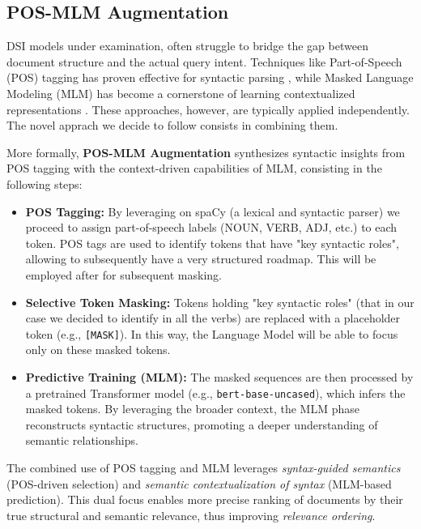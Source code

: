 \subsection{POS-MLM Augmentation}
DSI models under examination, often struggle to bridge the gap between document structure and the actual query intent. Techniques like Part-of-Speech (POS) tagging has proven effective for syntactic parsing \cite{toutanova2003feature}, while Masked Language Modeling (MLM) has become a cornerstone of learning contextualized representations \cite{devlin2018bert}. These approaches, however, are typically applied independently. The novel apprach we decide to follow consists in combining them.

More formally, \textbf{POS-MLM Augmentation} synthesizes syntactic insights from POS tagging with the context-driven capabilities of MLM, consisting in the following steps:

\begin{itemize}
    \item \textbf{POS Tagging:} By leveraging on spaCy (a lexical and syntactic parser) we proceed to assign part-of-speech labels (NOUN, VERB, ADJ, etc.) to each token.  POS tags are used to identify tokens that have  "key syntactic roles", allowing to subsequently have a very structured roadmap. This will be employed after for subsequent masking.
    \item \textbf{Selective Token Masking:} Tokens holding "key syntactic roles" (that in our case we decided to identify in all the verbs) are replaced with a placeholder token (e.g., \texttt{[MASK]}). In this way, the Language Model will be able to focus only on these masked tokens.
    \item \textbf{Predictive Training (MLM):} The masked sequences are then processed by a pretrained Transformer model (e.g., \texttt{bert-base-uncased}), which infers the masked tokens. By leveraging the broader context, the MLM phase reconstructs syntactic structures, promoting a deeper understanding of semantic relationships.
\end{itemize}

The combined use of POS tagging and MLM leverages \textit{syntax-guided semantics} (POS-driven selection) and \textit{semantic contextualization of syntax} (MLM-based prediction). This dual focus enables more precise ranking of documents by their true structural and semantic relevance, thus improving \textit{relevance ordering}.




























